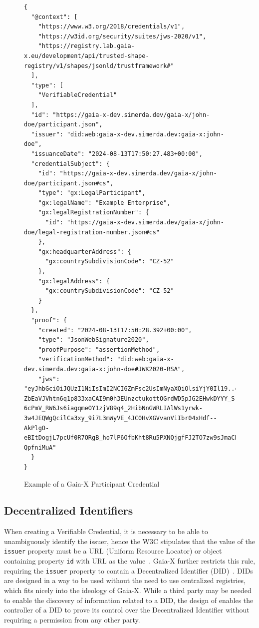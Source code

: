 \begin{figure}
\centering
\begin{verbatim}
{
  "@context": [
    "https://www.w3.org/2018/credentials/v1",
    "https://w3id.org/security/suites/jws-2020/v1",
    "https://registry.lab.gaia-x.eu/development/api/trusted-shape-registry/v1/shapes/jsonld/trustframework#"
  ],
  "type": [
    "VerifiableCredential"
  ],
  "id": "https://gaia-x-dev.simerda.dev/gaia-x/john-doe/participant.json",
  "issuer": "did:web:gaia-x-dev.simerda.dev:gaia-x:john-doe",
  "issuanceDate": "2024-08-13T17:50:27.483+00:00",
  "credentialSubject": {
    "id": "https://gaia-x-dev.simerda.dev/gaia-x/john-doe/participant.json#cs",
    "type": "gx:LegalParticipant",
    "gx:legalName": "Example Enterprise",
    "gx:legalRegistrationNumber": {
      "id": "https://gaia-x-dev.simerda.dev/gaia-x/john-doe/legal-registration-number.json#cs"
    },
    "gx:headquarterAddress": {
      "gx:countrySubdivisionCode": "CZ-52"
    },
    "gx:legalAddress": {
      "gx:countrySubdivisionCode": "CZ-52"
    }
  },
  "proof": {
    "created": "2024-08-13T17:50:28.392+00:00",
    "type": "JsonWebSignature2020",
    "proofPurpose": "assertionMethod",
    "verificationMethod": "did:web:gaia-x-dev.simerda.dev:gaia-x:john-doe#JWK2020-RSA",
    "jws": "eyJhbGciOiJQUzI1NiIsImI2NCI6ZmFsc2UsImNyaXQiOlsiYjY0Il19..cPShjGoSpCKGfjU6pvjQnGeXCiN36smCdSpkPwp6Ruf24bSzvKQ2Slg9mve84-ZbEaVJVhtn6q1p833xaCAI9m0h3EUnzctukottOGrdWD5pJG2EHwkDYYY_SrfOT_Y7uIYaSf46_2FPAzvHxGoTRGPkvR-6cPmV_RW6Js6iagqmeOY1zjV89q4_2HibNnGWRLIAlWs1yrwk-3w4JEQWgQcilCa3xy_9i7L3mWyVE_4JC0HvXGVvanViIbr04xHdf--AkPlgO-eBItDogjL7pcUf0R7ORgB_ho7lP6OfbKht8Ru5PXNQjgfFJ2TO7zw9sJmaCRCqenCjn-QpfniMuA"
  }
}
\end{verbatim}
\caption{Example of a Gaia-X Participant Credential}\label{fig:gaia_x_credential_example}
\end{figure}

\subsection{Decentralized Identifiers}\label{subsec:decentralized-identifiers}

When creating a Verifiable Credential, it is necessary to be able to unambiguously identify the issuer, hence the W3C stipulates that the value of the \texttt{issuer} property must be a URL (Uniform Resource Locator) or object containing property \texttt{id} with URL as the value~\cite{verifiable_credentials}.
Gaia-X further restricts this rule, requiring the \texttt{issuer} property to contain a Decentralized Identifier (DID)~\cite{did}. %
DIDs are designed in a way to be used without the need to use centralized registries, which fits nicely into the ideology of Gaia-X.
While a third party may be needed to enable the discovery of information related to a DID, the design of enables the controller of a DID to prove its control over the Decentralized Identifier without requiring a permission from any other party.

